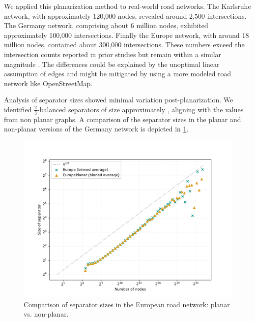 We applied this planarization method to real-world road networks.
The Karlsruhe network, with approximately 120,000 nodes, revealed around 2,500 intersections.
The Germany network, comprising about 6 million nodes, exhibited approximately 100,000 intersections.
Finally the Europe network, with around 18 million nodes, contained about 300,000 intersections.
These numbers exceed the  intersection counts reported
in prior studies but remain within a similar magnitude
\cite{eppstein_studying_2008}. The differences could be explained by the
unoptimal linear assumption of edges and might be mitigated by using a more
modeled road network like OpenStreetMap.

Analysis of separator sizes showed minimal variation post-planarization. We
identified \(\frac{2}{3}\)-balanced separators of size approximately
, aligning with the values from non planar graphs. A comparison of
the separator sizes in the planar and non-planar versions of the Germany
network is depicted in \cref{fig:germany_planar_vs_non_planar}.

\begin{figure}
	\centering
	\includegraphics[width=0.8\linewidth]{graphics/EuropePlanarVsNonPlanar.pdf}
	\caption{Comparison of separator sizes in the European road network: planar vs. non-planar.}
	\label{fig:germany_planar_vs_non_planar}
\end{figure}

